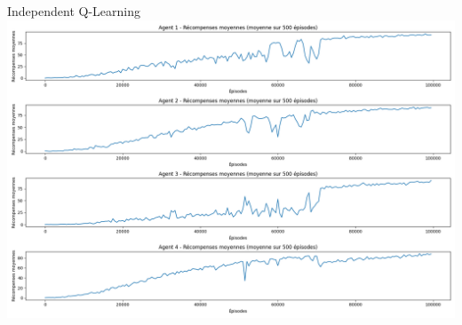 \documentclass[aspectratio=169,xcolor=dvipsnames]{beamer}
\begin{document}

\begin{frame}{Independent Q-Learning}
    \centering
    \includegraphics[width=0.9\paperwidth,height=0.75\paperheight,keepaspectratio]{images/AAA.png}
    
    \vspace{1em}
\end{frame}

\end{document}
